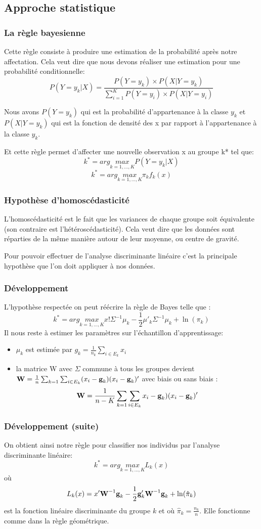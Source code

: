 \documentclass[b]{beamer}
\begin{document}
	\subsection{Approche statistique}
	\begin{frame}
	\frametitle{La règle bayesienne}
	Cette règle consiste à produire une estimation de la probabilité après notre affectation.
	Cela veut dire que nous devons réaliser une estimation pour une probabilité conditionnelle:
	\[
	P(Y = y_k | X) = \frac{P(Y = y_k) \times P(X| Y = y_k)}{\sum_{i=1}^{K} P(Y = y_i)\times P(X|Y = y_i)}
	\]
	
	Nous avons $P(Y = y_k)$ qui est la probabilité d'appartenance à la classe $y_k$ et $P(X|Y = y_k)$ qui est la fonction de densité des x par rapport à l'appartenance à la classe $y_k$.
	
	Et cette règle permet d'affecter une nouvelle observation x au groupe k* tel que:
	\[
		k^* = arg \underset{k=1,...,K}{max} P(Y = y_k | X)
	\] 
	\[
		k^*= arg \underset{k=1,...,K}{max} \pi_kf_k(x)
	\]	
	\end{frame}
	\begin{frame}
		\frametitle{Hypothèse d'homoscédasticité}
		L'homoscédasticité est le fait que les variances de chaque groupe soit équivalente (son contraire est l'hétéroscédasticité). Cela veut dire que les données sont réparties de la même manière autour de leur moyenne, ou centre de gravité. 
		
		Pour pouvoir effectuer de l'analyse discriminante linéaire c'est la principale hypothèse que l'on doit appliquer à nos données.
	\end{frame}
	
	\begin{frame}
		\frametitle{Développement}
		L'hypothèse respectée on peut réécrire la règle de Bayes telle que :
		\[
			k^* = arg \underset{k=1,...,K}{max}x!\Sigma^{-1}\mu_k - \frac{1}{2}\mu'_k\Sigma^{-1}\mu_k + \ln(\pi_k)
		\]
		Il nous reste à estimer les  paramètres sur l'échantillon d'apprentissage:
		\begin{itemize}
			\item $\mu_k$ est estimée par $g_k = \frac{1}{n_k}\sum_{i\in E_k}x_i$
			\item la matrice W avec $\Sigma$ commune à tous les groupes devient $\text{\bf W} = \frac{1}{n} \sum_{k=1}\sum_{i\in E_k}(x_i - \text{\bf g}_k)(x_i - \text{\bf g}_k)'$ avec biais ou sans biais :$$\text{\bf W} = \frac{1}{n - K}\sum_{k=1}\sum_{i\in E_k}x_i - \text{\bf g}_k)(x_i - \text{\bf g}_k)'$$
		\end{itemize}
	\end{frame}
	\begin{frame}
		\frametitle{Développement (suite)}
		On obtient ainsi notre règle pour classifier nos individus par l'analyse discriminante linéaire:
		\[
			k^* = arg \underset{k=1,...,K}{max}L_k(x)
		\]
		où
		\[
			L_k(x) = x'\text{\bf W}^{-1}\text{\bf g}_k - \frac{1}{2}\text{\bf g}'_k\text{\bf W}^{-1}\text{\bf g}_k + \ln(\hat{\pi}_k)
		\] est la fonction linéaire discriminante du groupe $k$ et où $\hat{\pi}_k = \frac{n_k}{n}$. Elle fonctionne comme dans la règle géométrique.
		
	\end{frame}
\end{document}
